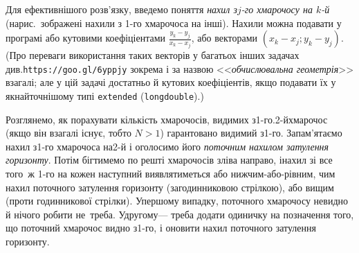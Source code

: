 \documentclass[14pt,a4paper]{extarticle}
\begin{document}
Для ефективнішого розв'язку, введемо поняття \emph{нахил з\nolinebreak[3] \mbox{$j$-го} хмарочосу на \mbox{$k$-й}} (на\nolinebreak[2] рис.\ зображені нахили з \mbox{1-го} хмарочоса на інші). Нахили можна подавати у програмі або кутовими коефіціентами
$\displaystyle\frac{y_k-y_j}{x_k-x_j}$,
або векторами $({x_k{-}x_j}; {y_k{-}y_j})$.
(Про переваги використання таких векторів у багатьох інших задачах
див.\nolinebreak[1] \verb"https://goo.gl/6yppjy" зокрема і за назвою <<\emph{обчислювальна геометрія}>> взагалі; але у цій задачі достатньо й кутових коефіціентів, якщо подавати їх у якнайточнішому типі \verb"extended" (\texttt{long\nolinebreak[3] double}).)

Розглянемо, як порахувати кількість хмарочосів, видимих з\nolinebreak[3] \mbox{1-го}.\linebreak[2] \mbox{2-й}\nolinebreak[3] хмарочос (якщо він взагалі існує, тобто ${N{>}1}$) гарантовано видимий з\nolinebreak[3] \mbox{1-го}. Запам’ятаємо нахил з\nolinebreak[3] \mbox{1-го} хмарочоса на\nolinebreak[3] \mbox{2-й} і оголосимо його \emph{поточним нахилом затулення горизонту}. Потім бігтимемо по решті хмарочосів зліва направо, і\nolinebreak[3] нахил зі все того~ж \mbox{1-го} на кожен наступний виявлятиметься або нижчим-або-рівним, чим нахил поточного затулення горизонту (за\nolinebreak[3] годинниковою стрілкою), або вищим (проти годинникової стрілки). У\nolinebreak[3] першому випадку, поточного хмарочосу не\nolinebreak[3] видно й нічого робити не~треба. У\nolinebreak[3] другому\nolinebreak[3] --- треба додати одиничку на позначення того, що поточний хмарочос видно з\nolinebreak[3] \mbox{1-го}, і оновити нахил поточного затулення горизонту.
\end{document}
